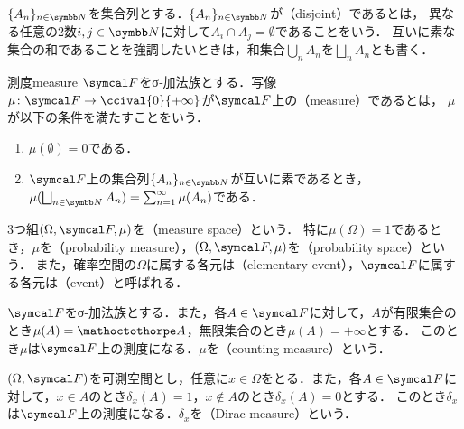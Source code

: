 \documentclass[../../main]{subfiles}
\begin{document}
\(\seq{A_n}_{n\in\numset{N}}\)を集合列とする．\(\seq{A_n}_{n\in\numset{N}}\)が（disjoint）であるとは，
異なる任意の2数\(i,j\in\numset{N}\)に対して\(A_i\cap A_j=\emptyset\)であることをいう．
互いに素な集合の和であることを強調したいときは，和集合\(\bigcup_nA_n\)を\(\bigsqcup_nA_n\)とも書く．

\begin{definition}{測度}{measure}
  \(\sigmaalg{F}\)をσ‐加法族とする．写像\(\mu\colon\sigmaalg{F}\to\ccival{0}{+\infty}\)が\(\sigmaalg{F}\)上の（measure）であるとは，
  \(\mu\)が以下の条件を満たすことをいう．
  \begin{enumerate}
    \item \(\mu(\emptyset)=0\)である．
    \item \(\sigmaalg{F}\)上の集合列\(\seq{A_n}_{n\in\numset{N}}\)が互いに素であるとき，\(\mu(\bigsqcup_{n\in\numset{N}}A_n)=\sum_{n=1}^\infty\mu(A_n)\)である．
  \end{enumerate}
\end{definition}

3つ組\((\Omega,\sigmaalg{F},\mu)\)を（measure space）という．
特に\(\mu(\Omega)=1\)であるとき，\(\mu\)を（probability measure），\((\Omega,\sigmaalg{F},\mu)\)を（probability space）という．
また，確率空間の\(\Omega\)に属する各元は（elementary event），\(\sigmaalg{F}\)に属する各元は（event）と呼ばれる．

\begin{example}[計数測度]
  \(\sigmaalg{F}\)をσ‐加法族とする．また，各\(A\in\sigmaalg{F}\)に対して，\(A\)が有限集合のとき\(\mu(A)=\sizeof{A}\)，無限集合のとき\(\mu(A)=+\infty\)とする．
  このとき\(\mu\)は\(\sigmaalg{F}\)上の測度になる．\(\mu\)を（counting measure）という．
\end{example}

\begin{example}[ディラック測度]
  \((\Omega,\sigmaalg{F})\)を可測空間とし，任意に\(x\in\Omega\)をとる．また，各\(A\in\sigmaalg{F}\)に対して，\(x\in A\)のとき\(\delta_x(A)=1\)，\(x\notin A\)のとき\(\delta_x(A)=0\)とする．
  このとき\(\delta_x\)は\(\sigmaalg{F}\)上の測度になる．\(\delta_x\)を（Dirac measure）という．
\end{example}
\end{document}
